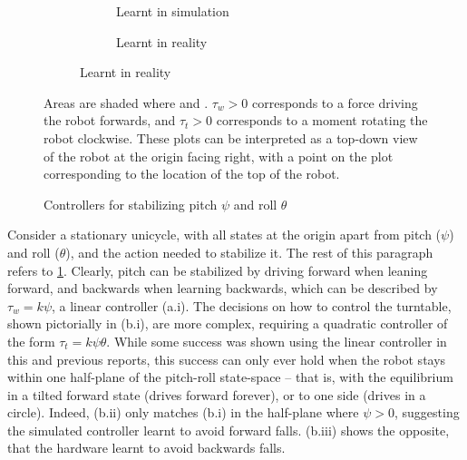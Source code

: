 \documentclass[main.tex]{subfiles}
\begin{document}
\begin{figure}[b!]
\begin{subfigure}[t]{\linewidth}
			\begin{subfigure}{(\linewidth - 2\ctlpadding)/3}
				\caption{Learnt in simulation}
			\end{subfigure}\hfill
			\begin{subfigure}{(\linewidth - 2\ctlpadding)/3}
				\caption{Learnt in reality}
			\end{subfigure}
		\end{subfigure}
		\caption{Controllers for stabilizing pitch $\psi$ and roll $\theta$}
		\label{fig:balancing}
		\medskip
		\small
		Areas are shaded where  and .
		$\tau_w > 0$ corresponds to a force driving the robot forwards, and $\tau_t > 0$ corresponds to a moment rotating the robot clockwise.
		These plots can be interpreted as a top-down view of the robot at the origin facing right, with a point on the plot corresponding to the location of the top of the robot.

	\end{figure}

	Consider a stationary unicycle, with all states at the origin apart from pitch ($\psi$) and roll ($\theta$), and the action needed to stabilize it.
	The rest of this paragraph refers to \cref{fig:balancing}.
	Clearly, pitch can be stabilized by driving forward when leaning forward, and backwards when learning backwards, which can be described by $\tau_w = k\psi$, a linear controller (a.i).
	The decisions on how to control the turntable, shown pictorially in (b.i), are more complex, requiring a quadratic controller of the form $\tau_t = k\psi\theta$.
	While some success was shown using the linear controller in this and previous reports, this success can only ever hold when the robot stays within one half-plane of the pitch-roll state-space -- that is, with the equilibrium in a tilted forward state (drives forward forever), or to one side (drives in a circle).
	Indeed, (b.ii) only matches (b.i) in the half-plane where $\psi > 0$, suggesting the simulated controller learnt to avoid forward falls. (b.iii) shows the opposite, that the hardware learnt to avoid backwards falls.
\end{document}
